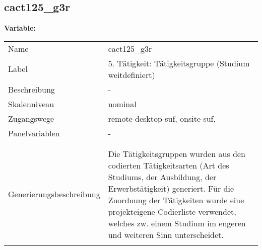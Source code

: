 	
	
	\subsection{cact125\_g3r}
	\label{subSection:cact125_g3r}

	\noindent\textbf{Variable:}\\
		\begin{tabular}{lL{11.3cm}}
			\label{tableVariable:cact125_g3r}
			Name & cact125\_g3r \\
			Label & 5. Tätigkeit: Tätigkeitsgruppe (Studium weitdefiniert) \\
			Beschreibung & - \\
			Skalenniveau & nominal \\
			Zugangswege &
				remote-desktop-suf,
				onsite-suf,
 \\
			Panelvariablen & -
			 \\
			 \\
 \\
					Generierungsbeschreibung & Die Tätigkeitsgruppen wurden aus den codierten Tätigkeitsarten (Art des Studiums, der Ausbildung, der Erwerbstätigkeit) generiert. Für die Zuordnung der Tätigkeiten wurde eine projekteigene Codierliste verwendet, welches zw. einem Studium im engeren und weiteren Sinn unterscheidet.
				 \\	
			 \\
		\end{tabular}






